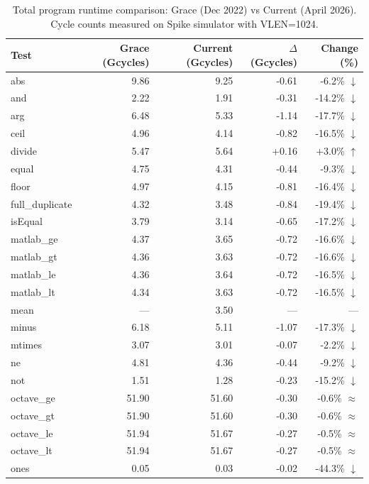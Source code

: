 \begin{table}[H]
\centering
\caption{Total program runtime comparison: Grace (Dec 2022) vs Current (April 2026). Cycle counts measured on Spike simulator with VLEN=1024.}
\label{tab:total-runtime}
\small
\begin{tabular}{l r r r r}
\toprule
Test & Grace (Gcycles) & Current (Gcycles) & $\Delta$ (Gcycles) & Change (\%) \\
\midrule
  abs & 9.86 & 9.25 & -0.61 & -6.2\% $\downarrow$ \\
  and & 2.22 & 1.91 & -0.31 & -14.2\% $\downarrow$ \\
  arg & 6.48 & 5.33 & -1.14 & -17.7\% $\downarrow$ \\
  ceil & 4.96 & 4.14 & -0.82 & -16.5\% $\downarrow$ \\
  divide & 5.47 & 5.64 & +0.16 & +3.0\% $\uparrow$ \\
  equal & 4.75 & 4.31 & -0.44 & -9.3\% $\downarrow$ \\
  floor & 4.97 & 4.15 & -0.81 & -16.4\% $\downarrow$ \\
  full\_duplicate & 4.32 & 3.48 & -0.84 & -19.4\% $\downarrow$ \\
  isEqual & 3.79 & 3.14 & -0.65 & -17.2\% $\downarrow$ \\
  matlab\_ge & 4.37 & 3.65 & -0.72 & -16.6\% $\downarrow$ \\
  matlab\_gt & 4.36 & 3.63 & -0.72 & -16.6\% $\downarrow$ \\
  matlab\_le & 4.36 & 3.64 & -0.72 & -16.5\% $\downarrow$ \\
  matlab\_lt & 4.34 & 3.63 & -0.72 & -16.5\% $\downarrow$ \\
  mean & --- & 3.50 & --- & ---  \\
  minus & 6.18 & 5.11 & -1.07 & -17.3\% $\downarrow$ \\
  mtimes & 3.07 & 3.01 & -0.07 & -2.2\% $\downarrow$ \\
  ne & 4.81 & 4.36 & -0.44 & -9.2\% $\downarrow$ \\
  not & 1.51 & 1.28 & -0.23 & -15.2\% $\downarrow$ \\
  octave\_ge & 51.90 & 51.60 & -0.30 & -0.6\% $\approx$ \\
  octave\_gt & 51.90 & 51.60 & -0.30 & -0.6\% $\approx$ \\
  octave\_le & 51.94 & 51.67 & -0.27 & -0.5\% $\approx$ \\
  octave\_lt & 51.94 & 51.67 & -0.27 & -0.5\% $\approx$ \\
  ones & 0.05 & 0.03 & -0.02 & -44.3\% $\downarrow$ \\

\end{tabular}
\end{table}
